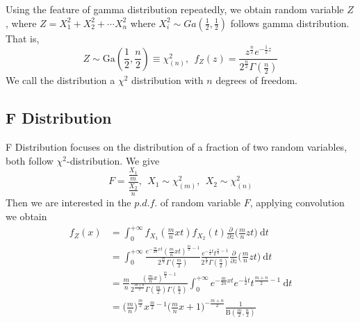 \documentclass[16pt]{article}
\begin{document}
Using the feature of gamma distribution repeatedly, we obtain random variable $Z$, where $Z= X_1^2+X_2^2+\cdots X_n^2$ where $X_i^2 \sim Ga(\frac{1}{2},\frac{1}{2}) $ follows gamma distribution. That is,
\begin{equation}
    Z\sim \text{Ga}(\frac{1}{2} ,\frac{n}{2})\equiv \chi^2_{(n)},~~\boxed{f_Z(z) = \frac{z^{\frac{n}{2}}e^{-\frac{1}{2}z}}{2^{\frac{n}{2}}\Gamma(\frac{n}{2})}}
\end{equation}
We call the distribution a $\chi^2$ distribution with $n$ degrees of freedom.

\subsection{F Distribution}
F Distribution focuses on the distribution of a fraction of two random variables, both follow $\chi^2$-distribution. We give
\begin{equation}
    F = \frac{\frac{X_1}{m}}{\frac{X_2}{n}},~~X_1 \sim \chi^2_{(m)},~~X_2 \sim \chi^2_{(n)}
\end{equation}
Then we are interested in the $p.d.f.$ of random variable $F$, applying convolution we obtain
\begin{equation}
\begin{aligned}
    f_Z(x) &= \int^{+\infty}_{0} f_{X_1}(\frac{m}{n}xt) f_{X_2}(t)\frac{\partial}{\partial z}\bigg(\frac{m}{n}zt\bigg)~\text{d}t \\
    &= \int^{+\infty}_{0} \frac{e^{-\frac{m}{2n}xt} (\frac{m}{n}xt)^{\frac{m}{2}-1}}{2^{\frac{m}{2}}\Gamma(\frac{m}{2})} \frac{e^{-\frac{1}{2}t}t^{\frac{n}{2}-1}}{2^{\frac{n}{2}}\Gamma(\frac{n}{2})} \frac{\partial}{\partial z}\bigg(\frac{m}{n}zt\bigg)~\text{d}t \\
    &= \frac{m}{n} \frac{(\frac{m}{n}x)^{\frac{m}{2}-1}}{2^{\frac{m+n}{2}} \Gamma(\frac{m}{2} )\Gamma(\frac{n}{2})} \int_{0}^{+\infty} e^{-\frac{m}{2n}xt} e^{-\frac{1}{2}t} t^{\frac{m+n}{2}-1}~\text{d}t\\
    &= \boxed{\bigg(\frac{m}{n}\bigg)^{\frac{m}{2}} x^{\frac{m}{2}-1} \bigg(\frac{m}{n}x+1\bigg)^{-\frac{m+n}{2}} \frac{1}{\text{B}(\frac{m}{2},\frac{n}{2})}}
\end{aligned}
\end{equation}
\end{document}
